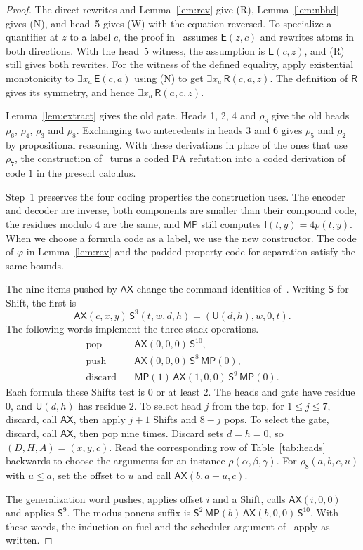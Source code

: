\documentclass[11pt,letterpaper]{article}
\newcommand{\PA}{\mathrm{PA}}
\newcommand{\ax}{\mathsf{AX}}
\newcommand{\mpc}{\mathsf{MP}}
\newcommand{\shift}{\mathsf{S}}
\newcommand{\Ic}{\mathsf{I}}
\newcommand{\Uc}{\mathsf{U}}
\newcommand{\Ec}{\mathsf{E}}
\newcommand{\Rc}{\mathsf{R}}
\begin{document}
\begin{proof}
The direct rewrites and Lemma~\ref{lem:rev} give (R),
Lemma~\ref{lem:nbhd} gives (N), and head~5 gives (W) with the
equation reversed. To specialize a quantifier at $z$ to a label $c$,
the proof in~\cite{pa209} assumes $\Ec(z,c)$ and rewrites atoms in
both directions. With the head~5 witness, the assumption is
$\Ec(c,z)$, and (R) still gives both rewrites. For the witness of the
defined equality, apply existential monotonicity to $\exists x_a\,\Ec(c,a)$ using (N) to get
$\exists x_a\,\Rc(c,a,z)$. The definition of $\Rc$ gives its symmetry,
and hence $\exists x_a\,\Rc(a,c,z)$.

Lemma~\ref{lem:extract} gives the old gate. Heads 1, 2, 4 and
$\rho_8$ give the old heads $\rho_6$, $\rho_4$, $\rho_3$ and
$\rho_8$. Exchanging two antecedents in heads 3 and 6 gives $\rho_5$
and $\rho_2$ by propositional reasoning. With these derivations in
place of the ones that use $\rho_7$, the construction
of~\cite[\S6.1]{pa209} turns a coded $\PA$ refutation into a coded
derivation of code $1$ in the present calculus.

Step~1 preserves the four coding properties the construction uses.
The encoder and decoder are inverse, both components are smaller
than their compound code, the residues modulo $4$ are the same, and
$\mpc$ still computes $\Ic(t,y)=4p(t,y)$. When we choose a formula
code as a label, we use the new constructor. The code of $\varphi$
in Lemma~\ref{lem:rev} and the padded property code for separation
satisfy the same bounds.

The nine items pushed by $\ax$ change the command identities
of~\cite[\S6.2]{pa209}. Writing $\shift$ for Shift, the first is
\[
 \ax(c,x,y)\,\shift^{9}(t,w,d,h)=(\Uc(d,h),w,0,t).
\]
The following words implement the three stack operations.
\[
\begin{aligned}
\text{pop}\quad & \ax(0,0,0)\,\shift^{10},\\
\text{push}\quad & \ax(0,0,0)\,\shift^{8}\,\mpc(0),\\
\text{discard}\quad & \mpc(1)\,\ax(1,0,0)\,\shift^{9}\,\mpc(0).
\end{aligned}
\]
Each formula these Shifts test is $0$ or at least $2$. The heads
and gate have residue $0$, and $\Uc(d,h)$ has residue $2$. To select
head $j$ from the top, for $1\le j\le7$, discard, call $\ax$, then
apply $j+1$ Shifts and $8-j$ pops. To select the gate, discard, call
$\ax$, then pop nine times. Discard sets $d=h=0$, so
$(D,H,A)=(x,y,c)$. Read the corresponding row of
Table~\ref{tab:heads} backwards to choose the arguments for an
instance $\rho(\alpha,\beta,\gamma)$. For $\rho_8(a,b,c,u)$ with
$u\le a$, set the offset to $u$ and call $\ax(b,a-u,c)$.

The generalization word pushes, applies offset $i$ and a Shift,
calls $\ax(i,0,0)$ and applies $\shift^{9}$. The modus ponens suffix
is $\shift^{2}\,\mpc(b)\,\ax(b,0,0)\,\shift^{10}$. With these words,
the induction on fuel and the scheduler argument
of~\cite[\S6.2--6.3]{pa209} apply as written.
\end{proof}
\end{document}
